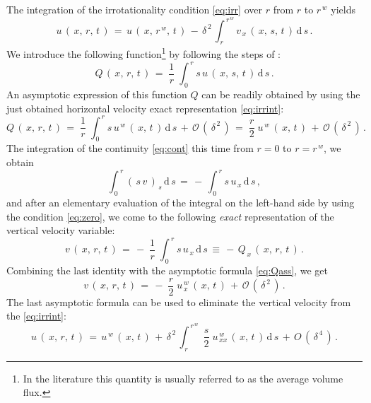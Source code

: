 \documentclass[alpha-refs, 12pt]{wiley-article}
\renewcommand{\O}{\mathcal{O}}
\begin{document}
The integration of the irrotationality condition \eqref{eq:irr} over $r$ from $r$ to $r^{\,w}$ yields
\begin{equation}\label{eq:irrint}
  u\,(\,x,\,r,\,t\,)\,=\,u\,(\,x,\,r^{\,w},\,t\,)\,-\,\delta^{\,2}\,\int_{\,r}^{\,r^{\,w}} v_{\,x}\,(\,x,\,s,\,t\,)\,\mathrm{d}\,s\,.
\end{equation}
We introduce the following function\footnote{In the literature this quantity is usually referred to as the average volume flux.} by following the steps of \citep{Mitsotakis2019}:
\begin{equation*}
  Q\,(\,x,\,r,\,t\,)\,=\;\frac{1}{r}\; \int_{\,0}^{\,r} s\,u\,(\,x,\,s,\,t\,)\,\mathrm{d}\,s\,.
\end{equation*}
An asymptotic expression of this function $Q$ can be readily obtained by using the just obtained horizontal velocity exact representation \eqref{eq:irrint}:
\begin{equation}\label{eq:Qass}
  Q\,(\,x,\,r,\,t\,)\,=\;\frac{1}{r}\; \int_{\,0}^{\,r}s\,u^{\,w}\,(\,x,\,t\,)\,\mathrm{d}\,s\,+\,\O\,(\,\delta^{\,2}\,)\,=\;\frac{r}{2}\;u^{\,w}\,(\,x,\,t\,)\,+\,\O\,(\,\delta^{\,2}\,)\,.
\end{equation}
The integration of the continuity \cref{eq:cont} this time from $r = 0$ to $r = r^{\,w}$, we obtain
\begin{equation*}
  \int_{\,0}^{\,r}(\,s\,v\,)_{\,s}\,\mathrm{d}\,s\,=\,-\,\int_{\,0}^{\,r} s\,u_{\,x}\,\mathrm{d}\,s\,,
\end{equation*}
and after an elementary evaluation of the integral on the left-hand side by using the condition \eqref{eq:zero}, we come to the following \emph{exact} representation of the vertical velocity variable:
\begin{equation*}
  v\,(\,x,\,r,\,t\,)\,=\,-\;\frac{1}{r}\;\int_{\,0}^{\,r}s\,u_{\,x}\,\mathrm{d}\,s\, \equiv \,-\,Q_{\,x}\,(\,x,\,r,\,t\,)\,.
\end{equation*}
Combining the last identity with the asymptotic formula \eqref{eq:Qass}, we get
\begin{equation}\label{eq:l6}
  v\,(\,x,\,r,\,t\,)\,=\,-\;\frac{r}{2}\;u^{\,w}_{\,x}\,(\,x,\,t\,)\,+\,\O\,(\,\delta^{\,2}\,)\,.
\end{equation}
The last asymptotic formula can be used to eliminate the vertical velocity from the \cref{eq:irrint}:
\begin{equation*}
  u\,(\,x,\,r,\,t\,)\,=\,u^{\,w}\,(\,x,\,t\,)\,+\,\delta^{\,2}\, \int_{\,r}^{\,r^{\,w}}\;\frac{s}{2}\;u^{\,w}_{\,xx}\,(\,x,\,t\,)\,\mathrm{d}\,s\,+\,O\,(\,\delta^{\,4}\,)\,.
\end{equation*}
\end{document}
